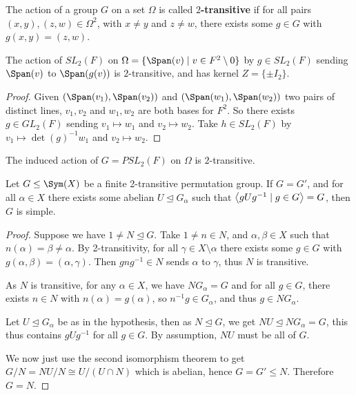 \documentclass{article}
\begin{document}
\begin{definition}
    The action of a group $G$ on a set $\Omega$ is called \textbf{$2$-transitive} if for all pairs $(x,y),(z,w)\in \Omega^2$, with $x\neq y$ and $z\neq w$, there exists some $g\in G$ with $g(x,y)=(z,w)$.
\end{definition}

\begin{lemma}
    The action of $SL_2(F)$ on $\Omega = \{\Span(v) \mid  v \in F^2\setminus 0\}$ by $g\in SL_2(F)$ sending $\Span(v)$ to $\Span(g(v))$ is $2$-transitive, and has kernel $Z=\{\pm I_2\}$.
    \begin{proof}
        Given $(\Span(v_1),\Span(v_2))$ and $(\Span(w_1),\Span(w_2))$ two pairs of distinct lines, $v_1,v_2$ and $w_1,w_2$ are both bases for $F^2$. So there exists $g\in GL_2(F)$ sending $v_1\mapsto w_1$ and $v_2\mapsto w_2$. Take $h\in SL_2(F)$ by $v_1\mapsto \det(g)^{-1} w_1$ and $v_2\mapsto w_2$.
    \end{proof}
\end{lemma}

\begin{corollary}
    The induced action of $G=PSL_2(F)$ on $\Omega$ is $2$-transitive.
\end{corollary}

\begin{theorem}
    Let $G\leq \Sym(X)$ be a finite 2-transitive permutation group. If $G=G'$, and for all $\alpha \in X$ there exists some abelian $U\unlhd G_\alpha$ such that $\left\langle gUg^{-1}\mid g\in G \right\rangle=G$, then $G$ is simple.
    \begin{proof}
        Suppose we have $1\neq N \unlhd G$. Take $1\neq n \in N$, and $\alpha,\beta \in X$ such that $n(\alpha)=\beta\neq \alpha$. By 2-transitivity, for all $\gamma \in X\setminus \alpha$ there exists some $g\in G$ with $g(\alpha,\beta)=(\alpha,\gamma)$. Then $gng^{-1}\in N$ sends $\alpha$ to $\gamma$, thus $N$ is transitive.

        As $N$ is transitive, for any $\alpha \in X$, we have $NG_\alpha =G$ and for all $g\in G$, there exists $n\in N$ with $n(\alpha)=g(\alpha)$, so $n^{-1}g \in G_\alpha$, and thus $g\in NG_\alpha$.

        Let $U\unlhd G_\alpha$ be as in the hypothesis, then as $N\unlhd G$, we get $NU\unlhd NG_\alpha=G$, this thus contains $gUg^{-1}$ for all $g\in G$. By assumption, $NU$ must be all of $G$.

        We now just use the second isomorphism theorem to get $G/N = NU/N \cong U/(U\cap N)$ which is abelian, hence $G=G'\leq N$. Therefore $G=N$.
    \end{proof}
\end{theorem}
\end{document}
